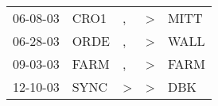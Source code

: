 \begin{supertabular}{p{0.07\textwidth}p{0.06\textwidth}p{0.02\textwidth}p{0.02\textwidth}p{0.06\textwidth}}
 06-08-03\textsuperscript{} &  CRO1\textsuperscript{} &             , &  \textgreater &  MITT\textsuperscript{} \\
 06-28-03\textsuperscript{} &  ORDE\textsuperscript{} &             , &  \textgreater &  WALL\textsuperscript{} \\
 09-03-03\textsuperscript{} &  FARM\textsuperscript{} &             , &  \textgreater &  FARM\textsuperscript{} \\
 12-10-03\textsuperscript{} &  SYNC\textsuperscript{} &  \textgreater &  \textgreater &   DBK\textsuperscript{} \\
\end{supertabular}
